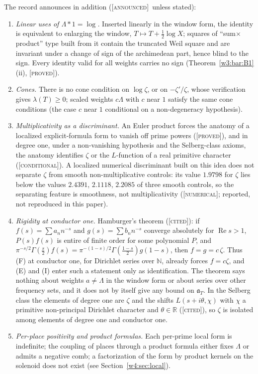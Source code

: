 \documentclass[11pt]{amsart}
\theoremstyle{definition}
\theoremstyle{remark}
\numberwithin{equation}{section}
\newcommand{\R}{\mathbb{R}}
\newcommand{\N}{\mathbb{N}}
\DeclareMathOperator{\Rel}{Re}
\newcommand{\aT}{\mathfrak{a}_T}                       %
\newcommand{\lam}{\lambda(T)}                          %
\newcommand{\stag}[1]{\textsc{[#1]}}
\newcommand{\PROVED}{\stag{proved}}
\newcommand{\CITED}{\stag{cited}}
\newcommand{\COND}{\stag{conditional}}
\newcommand{\NUM}{\stag{numerical}}
\newcommand{\ANNOUNCED}{\stag{announced}}
\begin{document}
The record announces in addition (\ANNOUNCED\ unless stated):
\begin{enumerate}[label=(\alph*)]
\item\emph{Linear uses of $\Lambda\ast1=\log$.} Inserted linearly in the window form, the identity is equivalent
to enlarging the window, $T\mapsto T+\frac12\log X$; squares of ``sum$\times$product'' type built from it contain
the truncated Weil square and are invariant under a change of sign of the archimedean part, hence blind to the
sign. Every identity valid for all weights carries no sign (Theorem~\ref{w3:bar:B1}(ii), \PROVED).
\item\emph{Cones.} There is no cone condition on $\log\zeta$, or on $-\zeta'/\zeta$, whose verification gives
$\lam\ge0$; scaled weights $c\Lambda$ with $c$ near $1$ satisfy the same cone conditions (the case $c$ near $1$
conditional on a non-degeneracy hypothesis).
\item\emph{Multiplicativity as a discriminant.} An Euler product forces the anatomy of a localized
explicit-formula form to vanish off prime powers \cite[Theorem~3.1]{P10} (\PROVED), and in degree one, under a
non-vanishing hypothesis and the Selberg-class axioms, the anatomy identifies $\zeta$ or the $L$-function of a
real primitive character \cite[Theorem~10.1]{P10} (\COND). A localized numerical discriminant built on this
idea does not separate $\zeta$ from smooth non-multiplicative controls: its value $1.9798$ for $\zeta$ lies
below the values $2.4391$, $2.1118$, $2.2085$ of three smooth controls, so the separating feature is smoothness,
not multiplicativity (\NUM; reported, not reproduced in this paper).
\item\emph{Rigidity at conductor one.} Hamburger's theorem \cite{Hamburger1921} (\CITED): if
$f(s)=\sum a_nn^{-s}$ and $g(s)=\sum b_nn^{-s}$ converge absolutely for $\Rel s>1$, $P(s)f(s)$ is entire of finite
order for some polynomial $P$, and $\pi^{-s/2}\Gamma(\frac s2)f(s)=\pi^{-(1-s)/2}\Gamma(\frac{1-s}2)g(1-s)$, then
$f=g=c\,\zeta$. Thus (F) at conductor one, for Dirichlet series over $\N$, already forces $f=c\zeta$, and (E)
and (I) enter such a statement only as identification. The theorem says nothing about weights $a\ne\Lambda$ in
the window form or about series over other frequency sets, and it does not by itself give any bound on $\aT$.
In the Selberg class the elements of degree one are $\zeta$ and the shifts $L(s+i\theta,\chi)$ with $\chi$
a primitive non-principal Dirichlet character and $\theta\in\R$ \cite{KaczorowskiPerelli1999} (\CITED), so $\zeta$ is isolated among elements of degree one and
conductor one.
\item\emph{Per-place positivity and product formulas.} Each per-prime local form is indefinite; the coupling of
places through a product formula either fixes $\Lambda$ or admits a negative comb; a factorization of the form
by product kernels on the solenoid does not exist (see Section~\ref{w4:sec:local}).
\end{enumerate}
\end{document}
